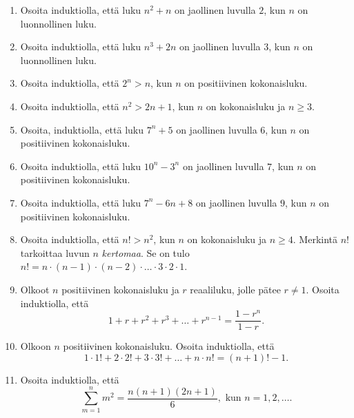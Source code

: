 \Harjoitustehtavat




\begin{enumerate}

\item Osoita induktiolla, että luku $n^2+n$ on jaollinen luvulla $2$, kun $n$ on luonnollinen luku.

\item Osoita induktiolla, että luku $n^3+2n$ on jaollinen luvulla $3$, kun $n$ on luonnollinen luku.

\item Osoita induktiolla, että $2^n > n$, kun $n$ on positiivinen kokonaisluku.

\item Osoita induktiolla, että $n^2 > 2n + 1$, kun $n$ on kokonaisluku ja $n \ge 3$.

\item Osoita, induktiolla, että luku $7^n + 5$ on jaollinen luvulla $6$, kun $n$ on positiivinen kokonaisluku.

\item Osoita induktiolla, että luku $10^n - 3^n$ on jaollinen luvulla $7$, kun $n$ on positiivinen kokonaisluku.

\item Osoita induktiolla, että luku $7^n - 6n + 8$ on jaollinen luvulla $9$, kun $n$ on positiivinen kokonaisluku.

\item Osoita induktiolla, että $n! > n^2$, kun $n$ on kokonaisluku ja $n \ge 4$. Merkintä $n!$ tarkoittaa luvun $n$ {\em kertomaa}. Se on tulo $n! = n \cdot (n-1) \cdot (n-2) \cdot \ldots \cdot 3 \cdot 2 \cdot 1$.

\item Olkoot $n$ positiivinen kokonaisluku ja $r$ reaaliluku, jolle pätee $r \neq 1$. Osoita induktiolla, että 
\[
1 + r + r^2 + r^3 + \ldots + r^{n-1} = \frac{1-r^n}{1-r}.
\]

\item Olkoon $n$ positiivinen kokonaisluku. Osoita induktiolla, että 
\[
1 \cdot 1! + 2 \cdot 2! + 3 \cdot 3! + \ldots + n \cdot n! = (n + 1)! - 1.
\]

\item 
Osoita induktiolla, että 
\[
\sum_{m=1}^n m^2= \frac{n(n+1)(2n+1)}{6}, \textrm{ kun } n=1,2,\ldots.
\]


\end{enumerate}
